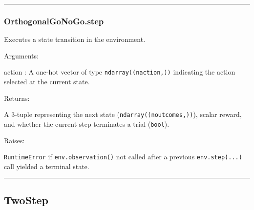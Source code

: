 \begin{Shaded}
\begin{Highlighting}[]
\OperatorTok{=}
\end{Highlighting}
\end{Shaded}

\begin{center}\rule{0.5\linewidth}{\linethickness}\end{center}

\subsubsection{OrthogonalGoNoGo.step}\label{orthogonalgonogo.step}

\begin{Shaded}
\begin{Highlighting}[]
\end{Highlighting}
\end{Shaded}

Executes a state transition in the environment.

Arguments:

action : A one-hot vector of type \texttt{ndarray((naction,))}
indicating the action selected at the current state.

Returns:

A 3-tuple representing the next state (\texttt{ndarray((noutcomes,))}),
scalar reward, and whether the current step terminates a trial
(\texttt{bool}).

Raises:

\texttt{RuntimeError} if \texttt{env.observation()} not called after a
previous \texttt{env.step(...)} call yielded a terminal state.

\begin{center}\rule{0.5\linewidth}{\linethickness}\end{center}

\subsection{TwoStep}\label{twostep}

\begin{Shaded}
\begin{Highlighting}[]
\end{Highlighting}
\end{Shaded}

